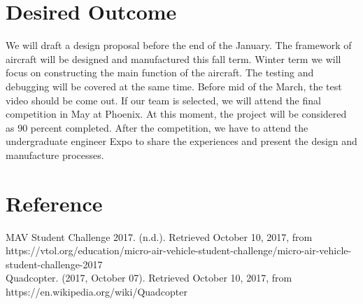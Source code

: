 \documentclass[letterpaper,10pt,draftclsnofoot,onecolumn]{IEEEtran}
\begin{document}
\begin{flushleft}
\section{Desired Outcome}
We will draft a design proposal before the end of the January. The framework of aircraft will be designed and manufactured this fall term. Winter term we will focus on constructing the main function of the aircraft. The testing and debugging will be covered at the same time. Before mid of the March, the test video should be come out. If our team is selected, we will attend the final competition in May at Phoenix. At this moment, the project will be considered as 90 percent completed. After the competition, we have to attend the undergraduate engineer Expo to share the experiences and present the design and manufacture processes.




\section{Reference}
MAV Student Challenge 2017. (n.d.). Retrieved October 10, 2017, from https://vtol.org/education/micro-air-vehicle-student-challenge/micro-air-vehicle-student-challenge-2017\\
Quadcopter. (2017, October 07). Retrieved October 10, 2017, from https://en.wikipedia.org/wiki/Quadcopter

\clearpage
\end{flushleft}
\end{document}
